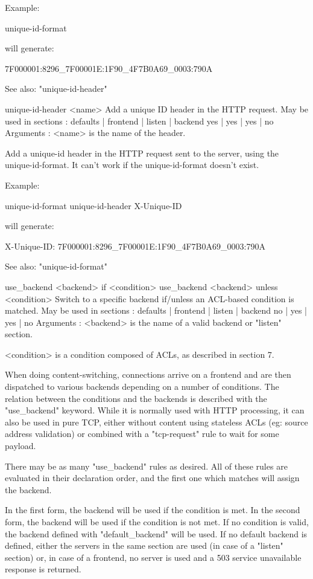   Example:

        unique-id-format %

        will generate:

               7F000001:8296_7F00001E:1F90_4F7B0A69_0003:790A

  See also: "unique-id-header"

unique-id-header <name>
  Add a unique ID header in the HTTP request.
  May be used in sections :   defaults | frontend | listen | backend
                                  yes  |    yes   |   yes  |   no
  Arguments :
    <name>   is the name of the header.

  Add a unique-id header in the HTTP request sent to the server, using the
  unique-id-format. It can't work if the unique-id-format doesn't exist.

  Example:

        unique-id-format %
        unique-id-header X-Unique-ID

        will generate:

           X-Unique-ID: 7F000001:8296_7F00001E:1F90_4F7B0A69_0003:790A

    See also: "unique-id-format"

use_backend <backend> if <condition>
use_backend <backend> unless <condition>
  Switch to a specific backend if/unless an ACL-based condition is matched.
  May be used in sections :   defaults | frontend | listen | backend
                                  no   |    yes   |   yes  |   no
  Arguments :
    <backend>   is the name of a valid backend or "listen" section.

    <condition> is a condition composed of ACLs, as described in section 7.

  When doing content-switching, connections arrive on a frontend and are then
  dispatched to various backends depending on a number of conditions. The
  relation between the conditions and the backends is described with the
  "use_backend" keyword. While it is normally used with HTTP processing, it can
  also be used in pure TCP, either without content using stateless ACLs (eg:
  source address validation) or combined with a "tcp-request" rule to wait for
  some payload.

  There may be as many "use_backend" rules as desired. All of these rules are
  evaluated in their declaration order, and the first one which matches will
  assign the backend.

  In the first form, the backend will be used if the condition is met. In the
  second form, the backend will be used if the condition is not met. If no
  condition is valid, the backend defined with "default_backend" will be used.
  If no default backend is defined, either the servers in the same section are
  used (in case of a "listen" section) or, in case of a frontend, no server is
  used and a 503 service unavailable response is returned.

